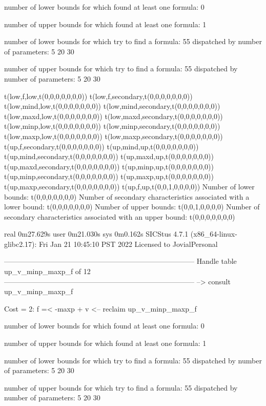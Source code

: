 number of lower bounds for which found at least one formula: 0

number of upper bounds for which found at least one formula: 1

number of lower bounds for which try to find a formula: 55
dispatched by number of parameters: 5  20  30

number of upper bounds for which try to find a formula: 55
dispatched by number of parameters: 5  20  30

t(low,f,low,t(0,0,0,0,0,0,0))
t(low,f,secondary,t(0,0,0,0,0,0,0))
t(low,mind,low,t(0,0,0,0,0,0,0))
t(low,mind,secondary,t(0,0,0,0,0,0,0))
t(low,maxd,low,t(0,0,0,0,0,0,0))
t(low,maxd,secondary,t(0,0,0,0,0,0,0))
t(low,minp,low,t(0,0,0,0,0,0,0))
t(low,minp,secondary,t(0,0,0,0,0,0,0))
t(low,maxp,low,t(0,0,0,0,0,0,0))
t(low,maxp,secondary,t(0,0,0,0,0,0,0))
t(up,f,secondary,t(0,0,0,0,0,0,0))
t(up,mind,up,t(0,0,0,0,0,0,0))
t(up,mind,secondary,t(0,0,0,0,0,0,0))
t(up,maxd,up,t(0,0,0,0,0,0,0))
t(up,maxd,secondary,t(0,0,0,0,0,0,0))
t(up,minp,up,t(0,0,0,0,0,0,0))
t(up,minp,secondary,t(0,0,0,0,0,0,0))
t(up,maxp,up,t(0,0,0,0,0,0,0))
t(up,maxp,secondary,t(0,0,0,0,0,0,0))
t(up,f,up,t(0,0,1,0,0,0,0))
Number of lower bounds:                                             t(0,0,0,0,0,0,0)
Number of secondary characteristics associated with a lower bound:  t(0,0,0,0,0,0,0)
Number of upper bounds:                                             t(0,0,1,0,0,0,0)
Number of secondary characteristics associated with an upper bound: t(0,0,0,0,0,0,0)

real	0m27.629s
user	0m21.030s
sys	0m0.162s
SICStus 4.7.1 (x86_64-linux-glibc2.17): Fri Jan 21 10:45:10 PST 2022
Licensed to JovialPersonal


--------------------------------------------------------------------------------
Handle table up_v_minp_maxp_f of 12
--------------------------------------------------------------------------------
--> consult up_v_minp_maxp_f

Cost =  2:  f =< -maxp + v
<-- reclaim up_v_minp_maxp_f

number of lower bounds for which found at least one formula: 0

number of upper bounds for which found at least one formula: 1

number of lower bounds for which try to find a formula: 55
dispatched by number of parameters: 5  20  30

number of upper bounds for which try to find a formula: 55
dispatched by number of parameters: 5  20  30

